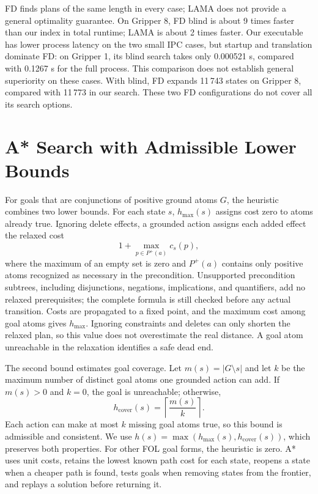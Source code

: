 \documentclass[10pt,a4paper]{article}
\begin{document}
FD finds plans of the same length in every case; LAMA does not provide
a general optimality guarantee. On Gripper 8, FD blind is about 9 times
faster than our index in total runtime; LAMA is about 2 times faster.
Our executable has lower process latency on the two small IPC cases, but
startup and translation dominate FD: on Gripper 1, its blind search
takes only 0.000521 s, compared with 0.1267 s for the full process. This
comparison does not establish general superiority on these cases. With
blind, FD expands 11\,743 states on Gripper 8, compared with 11\,773 in
our search. These two FD configurations do not cover all its search
options.

\section{A* Search with Admissible Lower Bounds}
For goals that are conjunctions of positive ground atoms $G$, the heuristic
combines two lower bounds. For each state $s$, $h_{\max}(s)$ assigns cost
zero to atoms already true. Ignoring delete effects, a grounded action assigns
each added effect the relaxed cost
\[
  1+\max_{p\in P^+(a)} c_s(p),
\]
where the maximum of an empty set is zero and $P^+(a)$ contains only positive
atoms recognized as necessary in the precondition. Unsupported precondition
subtrees, including disjunctions, negations, implications, and quantifiers,
add no relaxed prerequisites; the complete formula is still checked before
any actual transition. Costs are propagated to a fixed point, and the maximum
cost among goal atoms gives $h_{\max}$. Ignoring constraints and deletes can
only shorten the relaxed plan, so this value does not overestimate the real
distance. A goal atom unreachable in the relaxation identifies a safe dead end.

The second bound estimates goal coverage. Let $m(s)=|G\setminus s|$ and let
$k$ be the maximum number of distinct goal atoms one grounded action can add.
If $m(s)>0$ and $k=0$, the goal is unreachable; otherwise,
\[
  h_{\mathrm{cover}}(s)=\left\lceil\frac{m(s)}{k}\right\rceil.
\]
Each action can make at most $k$ missing goal atoms true, so this bound is
admissible and consistent. We use
$h(s)=\max(h_{\max}(s),h_{\mathrm{cover}}(s))$, which preserves both
properties. For other FOL goal forms, the heuristic is zero. A* uses unit
costs, retains the lowest known path cost for each state, reopens a state when
a cheaper path is found, tests goals when removing states from the frontier,
and replays a solution before returning it.
\end{document}
